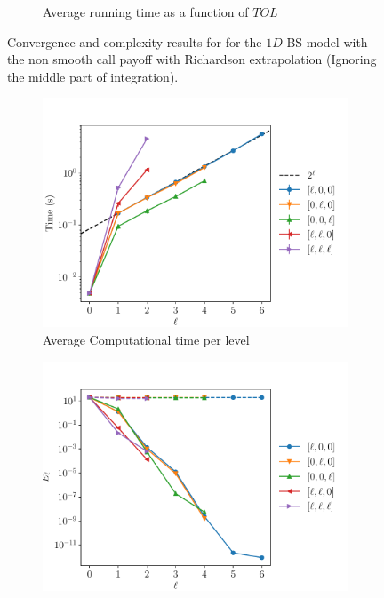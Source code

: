 \documentclass[11pt]{article}
\begin{document}
\begin{figure}[!h]
\begin{subfigure}{.5\textwidth}
		\caption{Average running time as a function of $TOL$}
		\label{fig:misc_1D_BS_2_4_step_non_smooth_richardson_without_middle_sub2}
	\end{subfigure}%
	\caption{Convergence and complexity results for for the $1D$ BS model with the non smooth call payoff with Richardson extrapolation (Ignoring the middle part of integration).}
	\label{fig:misc_1D_BS_2_4_step_non_smooth_richardson_without_middle_1}
\end{figure}



\begin{figure}[!h]
	\centering
	\begin{subfigure}{.5\textwidth}
		\centering
		\includegraphics[width=0.95\linewidth]{./figures/1D_BS_2_4_step_non_smooth_richardson_without_middle/level_work.pdf}
		\caption{Average Computational time per level}
		\label{fig:misc_1D_BS_2_4_step_non_smooth_richardson_without_middle_sub3}
	\end{subfigure}%
	\begin{subfigure}{.5\textwidth}
		\centering
		\includegraphics[width=0.95\linewidth]{./figures/1D_BS_2_4_step_non_smooth_richardson_without_middle/levels_error_rate.pdf}

\end{subfigure}
\end{figure}
\end{document}
